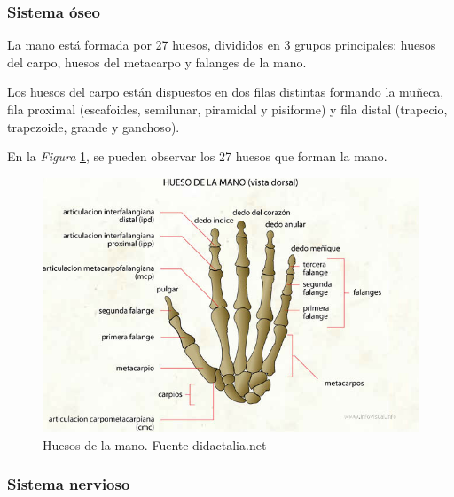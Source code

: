 \subsubsection{Sistema óseo}
La mano está formada por 27 huesos, divididos en 3 grupos principales: huesos del carpo, huesos del metacarpo y falanges de la mano.

Los huesos del carpo están dispuestos en dos filas distintas formando la muñeca, fila proximal (escafoides, semilunar, piramidal y pisiforme) y fila distal (trapecio, trapezoide, grande y ganchoso). \cite{mano_anatomía}

En la \textit{Figura} \ref{fig:Huesos_mano}, se pueden observar los 27 huesos que forman la mano.
\begin{figure}
    \centering
    \includegraphics[width=0.8\linewidth]{img/Huesos_mano.png}
    \caption{Huesos de la mano. Fuente didactalia.net}
    \label{fig:Huesos_mano}
\end{figure}
\subsubsection{Sistema nervioso}

